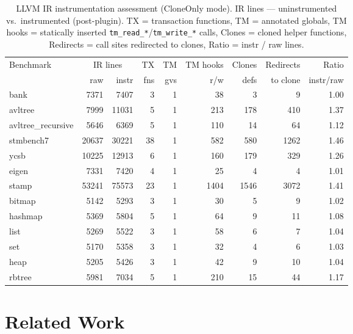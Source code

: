 \documentclass[article,12pt]{article}
\begin{document}
\begin{table}[t]
\centering
\small
\begin{tabular}{lrrrrrrrr}
\toprule
Benchmark & \multicolumn{2}{c}{IR lines} & TX & TM & TM hooks & Clones & Redirects & Ratio \\
          & raw & instr & fns & gvs & r\slash w & defs & to clone & instr\slash raw \\
\midrule
  bank &  7371 &  7407 &   3 &   1 &   38 &    3 &      9 & 1.00 \\
  avltree &  7999 & 11031 &   5 &   1 &  213 &  178 &    410 & 1.37 \\
  avltree\_recursive &  5646 &  6369 &   5 &   1 &  110 &   14 &     64 & 1.12 \\
  stmbench7 & 20637 & 30221 &  38 &   1 &  582 &  580 &   1262 & 1.46 \\
  ycsb & 10225 & 12913 &   6 &   1 &  160 &  179 &    329 & 1.26 \\
  eigen &  7331 &  7420 &   4 &   1 &   25 &    4 &      4 & 1.01 \\
  stamp & 53241 & 75573 &  23 &   1 & 1404 & 1546 &   3072 & 1.41 \\
  bitmap &  5142 &  5293 &   3 &   1 &   30 &    5 &      9 & 1.02 \\
  hashmap &  5369 &  5804 &   5 &   1 &   64 &    9 &     11 & 1.08 \\
  list &  5269 &  5522 &   3 &   1 &   58 &    6 &      7 & 1.04 \\
  set &  5170 &  5358 &   3 &   1 &   32 &    4 &      6 & 1.03 \\
  heap &  5205 &  5426 &   3 &   1 &   42 &    9 &     10 & 1.04 \\
  rbtree &  5981 &  7034 &   5 &   1 &  210 &   15 &     44 & 1.17 \\
\bottomrule
\end{tabular}
\caption{LLVM IR instrumentation assessment (CloneOnly mode).  IR lines ---
uninstrumented vs.\ instrumented (post-plugin).  TX = transaction
functions, TM = annotated globals, TM hooks = statically inserted
\texttt{tm\_read\_*}/\texttt{tm\_write\_*} calls, Clones = cloned
helper functions, Redirects = call sites redirected to clones,
Ratio = instr / raw lines.}
\label{tab:instrumentation-assessment}
\end{table}

\section{Related Work}\label{sec:related}
\end{document}
